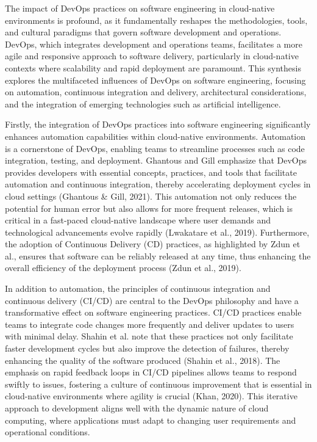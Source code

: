 The impact of DevOps practices on software engineering in cloud-native environments is profound, as it fundamentally reshapes the methodologies, tools, and cultural paradigms that govern software development and operations. DevOps, which integrates development and operations teams, facilitates a more agile and responsive approach to software delivery, particularly in cloud-native contexts where scalability and rapid deployment are paramount. This synthesis explores the multifaceted influences of DevOps on software engineering, focusing on automation, continuous integration and delivery, architectural considerations, and the integration of emerging technologies such as artificial intelligence.

Firstly, the integration of DevOps practices into software engineering significantly enhances automation capabilities within cloud-native environments. Automation is a cornerstone of DevOps, enabling teams to streamline processes such as code integration, testing, and deployment. Ghantous and Gill emphasize that DevOps provides developers with essential concepts, practices, and tools that facilitate automation and continuous integration, thereby accelerating deployment cycles in cloud settings (Ghantous & Gill, 2021). This automation not only reduces the potential for human error but also allows for more frequent releases, which is critical in a fast-paced cloud-native landscape where user demands and technological advancements evolve rapidly (Lwakatare et al., 2019). Furthermore, the adoption of Continuous Delivery (CD) practices, as highlighted by Zdun et al., ensures that software can be reliably released at any time, thus enhancing the overall efficiency of the deployment process (Zdun et al., 2019).

In addition to automation, the principles of continuous integration and continuous delivery (CI/CD) are central to the DevOps philosophy and have a transformative effect on software engineering practices. CI/CD practices enable teams to integrate code changes more frequently and deliver updates to users with minimal delay. Shahin et al. note that these practices not only facilitate faster development cycles but also improve the detection of failures, thereby enhancing the quality of the software produced (Shahin et al., 2018). The emphasis on rapid feedback loops in CI/CD pipelines allows teams to respond swiftly to issues, fostering a culture of continuous improvement that is essential in cloud-native environments where agility is crucial (Khan, 2020). This iterative approach to development aligns well with the dynamic nature of cloud computing, where applications must adapt to changing user requirements and operational conditions.


